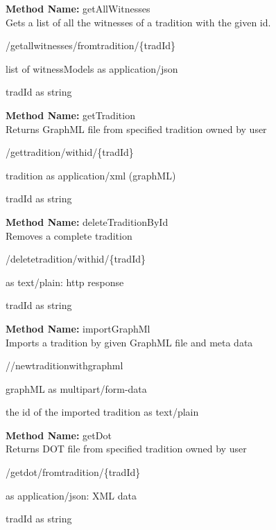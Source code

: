 \textbf{Method Name: }getAllWitnesses \\ Gets a list of all the witnesses of a tradition with the given id.
\begin{get}
/getallwitnesses/fromtradition/\{tradId\}
\end{get}
\begin{response}
list of witnessModels as application/json
\end{response}
\begin{parameter}
tradId as string
\end{parameter}
\textbf{Method Name: }getTradition \\ Returns GraphML file from specified tradition owned by user
\begin{get}
/gettradition/withid/\{tradId\}
\end{get}
\begin{response}
tradition as application/xml (graphML)
\end{response}
\begin{parameter}
tradId as string
\end{parameter}
\textbf{Method Name: }deleteTraditionById \\ Removes a complete tradition
\begin{delete}
/deletetradition/withid/\{tradId\}
\end{delete}
\begin{response}
 as text/plain: http response
\end{response}
\begin{parameter}
tradId as string
\end{parameter}
\textbf{Method Name: }importGraphMl \\ Imports a tradition by given GraphML file and meta data
\begin{post}
//newtraditionwithgraphml
\end{post}
\begin{request}
 graphML as multipart/form-data
\end{request}
\begin{response}
the id of the imported tradition as text/plain
\end{response}
\textbf{Method Name: }getDot \\ Returns DOT file from specified tradition owned by user
\begin{get}
/getdot/fromtradition/\{tradId\}
\end{get}
\begin{response}
 as application/json: XML data
\end{response}
\begin{parameter}
tradId as string
\end{parameter}
